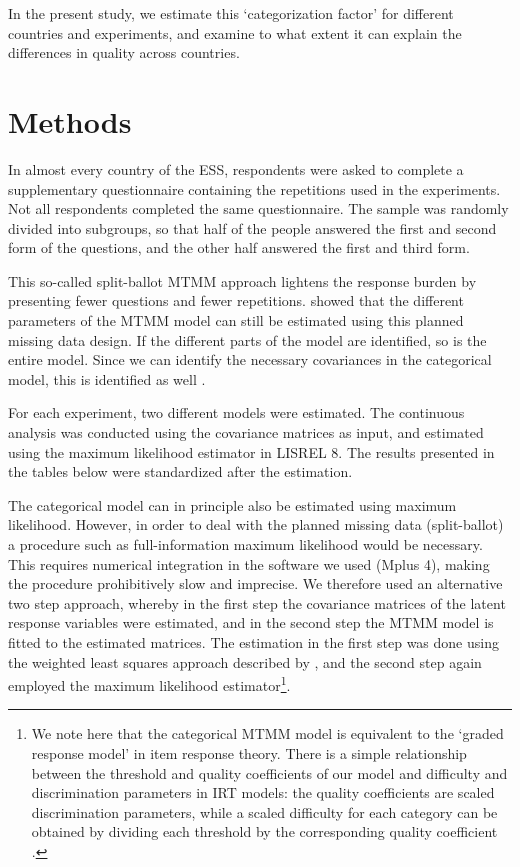 \documentclass[a4paper,12pt]{article}
\begin{document}
In the present study, we estimate this `categorization factor' for different countries and experiments, and examine to what extent it can explain the differences in quality across countries. 


\section{Methods}

In almost every country of the ESS, respondents were asked to complete a supplementary questionnaire containing the repetitions used in the experiments. Not all respondents completed the same questionnaire. The sample was randomly divided into subgroups, so that half of the people answered the first and second form of the questions, and the other half answered the first and third form. 

This so-called split-ballot MTMM approach lightens the response burden by presenting fewer questions and fewer repetitions. \citet{saris_new_2004} showed that the different parameters of the MTMM model can still be estimated using this planned missing data design. If the different parts of the model are identified,  so is the entire model. Since we can identify the necessary covariances in the categorical model, this is identified as well  \citep{millsap_assessing_2004}.

For each experiment, two different models were estimated. The continuous analysis was conducted using the covariance matrices as input, and estimated using the maximum likelihood estimator in LISREL 8. The results presented in the tables below were standardized after the estimation.

The categorical model can in principle also be estimated using maximum likelihood. However, in order to deal with the planned missing data (split-ballot) a procedure such as full-information maximum likelihood would be necessary. This requires numerical integration in the software we used (Mplus 4), making the procedure prohibitively slow and imprecise. We therefore used an alternative two step approach, whereby in the first step the covariance matrices of the latent response variables were estimated, and in the second step the MTMM model is fitted to the estimated matrices. The estimation in the first step was done using the weighted least squares approach described by \citet{flora_empirical_2004}, and the second step again employed the maximum likelihood estimator\footnote{We note here that the categorical MTMM model is equivalent to the `graded response model' in item response theory. There is a simple relationship between the threshold and quality coefficients of our model and difficulty and discrimination parameters in IRT models: the quality coefficients are scaled discrimination parameters, while a scaled difficulty for each category can be obtained by dividing each threshold by the corresponding quality coefficient \citep{muthen_latent_2002}.}.
\end{document}
